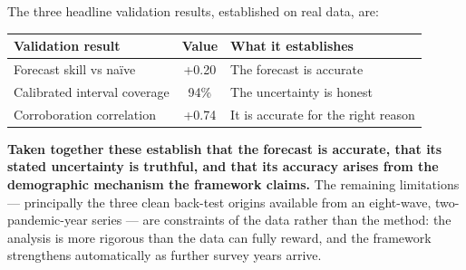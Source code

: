 \documentclass[ %
                    author={Ashrey Ashrey, Sanya Kapoor, Trisha Sharma, Yash Bhooshan Pandloskar},
                supervisor={Dr. Dalila O’Grady},
                    degree={MSc},
                     title={Using machine learning to forecast physical activity participation, volunteering and activity patterns in London},
                  subtitle={},
                      type={},
                      year={2021}]{dissertation}
\begin{document}
\noindent
The three headline validation results, established on real data, are:

\begin{table}[!htb]
\centering
\begin{tabular}{lcl}
\toprule
\textbf{Validation result} & \textbf{Value} & \textbf{What it establishes} \\
\midrule
Forecast skill vs naïve & +0.20 & The forecast is accurate \\
Calibrated interval coverage & 94\% & The uncertainty is honest \\
Corroboration correlation & +0.74 & It is accurate for the right reason \\
\bottomrule
\end{tabular}
\end{table}

\noindent
\textbf{Taken together these establish that the forecast is accurate, that its stated uncertainty is truthful, and that its accuracy arises from the demographic mechanism the framework claims.} The remaining limitations --- principally the three clean back-test origins available from an eight-wave, two-pandemic-year series --- are constraints of the data rather than the method: the analysis is more rigorous than the data can fully reward, and the framework strengthens automatically as further survey years arrive.


\end{document}
